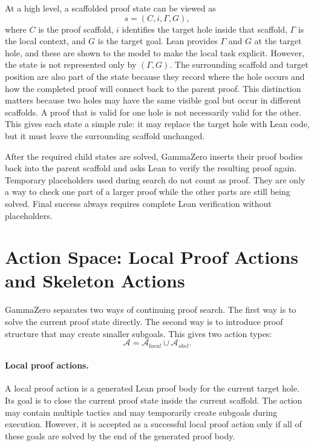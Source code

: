 \documentclass[en]{uet_awesome_thesis/uet-awesome-thesis}
\begin{document}
At a high level, a scaffolded proof state can be viewed as
\[
s = (C, i, \Gamma, G),
\]
where \(C\) is the proof scaffold, \(i\) identifies the target hole inside that scaffold, \(\Gamma\) is the local context, and \(G\) is the target goal. Lean provides \(\Gamma\) and \(G\) at the target hole, and these are shown to the model to make the local task explicit. However, the state is not represented only by \((\Gamma, G)\). The surrounding scaffold and target position are also part of the state because they record where the hole occurs and how the completed proof will connect back to the parent proof.
This distinction matters because two holes may have the same visible goal but occur in different scaffolds. A proof that is valid for one hole is not necessarily valid for the other.
This gives each state a simple rule: it may replace the target hole with Lean code, but it must leave the surrounding scaffold unchanged.

After the required child states are solved, GammaZero inserts their proof bodies back into the parent scaffold and asks Lean to verify the resulting proof again. Temporary placeholders used during search do not count as proof. They are only a way to check one part of a larger proof while the other parts are still being solved. Final success always requires complete Lean verification without placeholders.

\section{Action Space: Local Proof Actions and Skeleton Actions}

GammaZero separates two ways of continuing proof search. The first way is to solve the current proof state directly. The second way is to introduce proof structure that may create smaller subgoals. This gives two action types:
\[
\mathcal{A} = \mathcal{A}_{local} \cup \mathcal{A}_{skel}.
\]

\paragraph{Local proof actions.}
A local proof action is a generated Lean proof body for the current target hole. Its goal is to close the current proof state inside the current scaffold. The action may contain multiple tactics and may temporarily create subgoals during execution. However, it is accepted as a successful local proof action only if all of these goals are solved by the end of the generated proof body.
\end{document}
